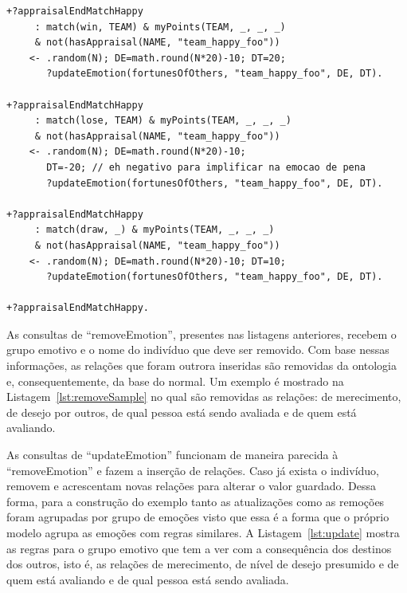 \begin{center}
    \begin{minipage}{140mm}
	\lstset{linewidth=140mm}
	\begin{lstlisting}[frame=trbl,
caption=Parte do código do agente referente à avaliação do final do jogo para
as emoções relacionadas com a consequência de eventos para outros.,
label=lst:soccerEnd2]
+?appraisalEndMatchHappy
     : match(win, TEAM) & myPoints(TEAM, _, _, _)
     & not(hasAppraisal(NAME, "team_happy_foo"))
    <- .random(N); DE=math.round(N*20)-10; DT=20;
       ?updateEmotion(fortunesOfOthers, "team_happy_foo", DE, DT).

+?appraisalEndMatchHappy
     : match(lose, TEAM) & myPoints(TEAM, _, _, _)
     & not(hasAppraisal(NAME, "team_happy_foo"))
    <- .random(N); DE=math.round(N*20)-10;
       DT=-20; // eh negativo para implificar na emocao de pena
       ?updateEmotion(fortunesOfOthers, "team_happy_foo", DE, DT).

+?appraisalEndMatchHappy
     : match(draw, _) & myPoints(TEAM, _, _, _)
     & not(hasAppraisal(NAME, "team_happy_foo"))
    <- .random(N); DE=math.round(N*20)-10; DT=10;
       ?updateEmotion(fortunesOfOthers, "team_happy_foo", DE, DT).

+?appraisalEndMatchHappy.
	\end{lstlisting}
    \end{minipage}
\end{center}

As consultas de ``removeEmotion'', presentes nas listagens anteriores, recebem
o grupo emotivo e o nome do indivíduo que deve ser removido. Com base nessas
informações, as relações que foram outrora inseridas são removidas da
ontologia e, consequentemente, da base do \jason normal. Um exemplo é mostrado
na Listagem~\ref{lst:removeSample} no qual são removidas as relações: de
merecimento, de desejo por outros, de qual pessoa está sendo avaliada e de
quem está avaliando.

As consultas de ``updateEmotion'' funcionam de maneira parecida à
``removeEmotion'' e fazem a inserção de relações. Caso já exista o
indivíduo, removem e acrescentam novas relações para alterar o valor guardado.
Dessa forma, para a construção do exemplo tanto as atualizações como as
remoções foram agrupadas por grupo de emoções visto que essa é a forma que
o próprio modelo \occ agrupa as emoções com regras similares. A Listagem~\ref{lst:update}
mostra as regras para o grupo emotivo que tem a ver com a consequência dos
destinos dos outros, isto é, as relações de merecimento, de nível de
desejo presumido e de quem está avaliando e de qual pessoa está sendo
avaliada.

